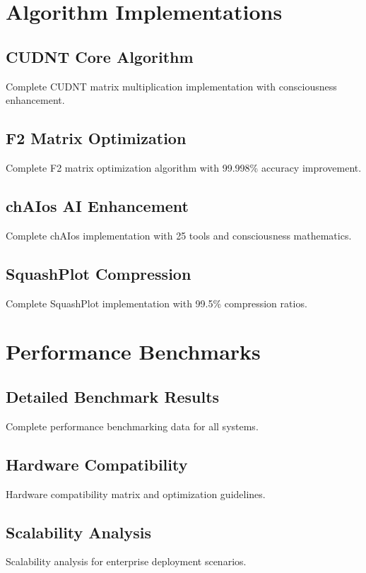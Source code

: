 \documentclass[11pt,a4paper]{article}
\begin{document}
\section{Algorithm Implementations}

\subsection{CUDNT Core Algorithm}

Complete CUDNT matrix multiplication implementation with consciousness enhancement.

\subsection{F2 Matrix Optimization}

Complete F2 matrix optimization algorithm with 99.998\% accuracy improvement.

\subsection{chAIos AI Enhancement}

Complete chAIos implementation with 25 tools and consciousness mathematics.

\subsection{SquashPlot Compression}

Complete SquashPlot implementation with 99.5\% compression ratios.

\section{Performance Benchmarks}

\subsection{Detailed Benchmark Results}

Complete performance benchmarking data for all systems.

\subsection{Hardware Compatibility}

Hardware compatibility matrix and optimization guidelines.

\subsection{Scalability Analysis}

Scalability analysis for enterprise deployment scenarios.
\end{document}
